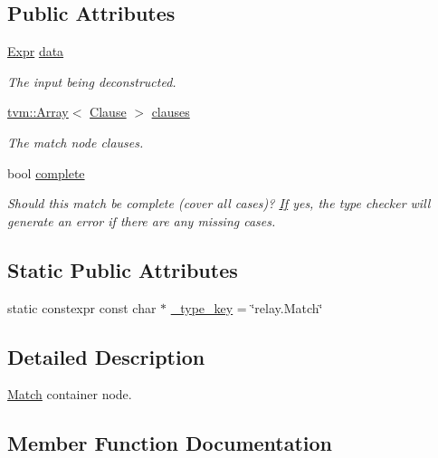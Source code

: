 \subsection*{Public Attributes}
\begin{DoxyCompactItemize}
\item 
\hyperlink{namespacetvm_1_1relay_a5b84e3790f89bb3fad5c7911eeb99531}{Expr} \hyperlink{classtvm_1_1relay_1_1MatchNode_a2bbd42a0a2bdbdf35662f8866c6a5f97}{data}
\begin{DoxyCompactList}\small\item\em The input being deconstructed. \end{DoxyCompactList}\item 
\hyperlink{classtvm_1_1Array}{tvm\+::\+Array}$<$ \hyperlink{classtvm_1_1relay_1_1Clause}{Clause} $>$ \hyperlink{classtvm_1_1relay_1_1MatchNode_a1e35f1c0a12e235eb052cd48f6659cd6}{clauses}
\begin{DoxyCompactList}\small\item\em The match node clauses. \end{DoxyCompactList}\item 
bool \hyperlink{classtvm_1_1relay_1_1MatchNode_a17c6c8bd3fccfa7f86ace014db7fd694}{complete}
\begin{DoxyCompactList}\small\item\em Should this match be complete (cover all cases)? \hyperlink{classtvm_1_1relay_1_1If}{If} yes, the type checker will generate an error if there are any missing cases. \end{DoxyCompactList}\end{DoxyCompactItemize}
\subsection*{Static Public Attributes}
\begin{DoxyCompactItemize}
\item 
static constexpr const char $\ast$ \hyperlink{classtvm_1_1relay_1_1MatchNode_ae09048eac4da99f3c259f431e376081d}{\+\_\+type\+\_\+key} = \char`\"{}relay.\+Match\char`\"{}
\end{DoxyCompactItemize}


\subsection{Detailed Description}
\hyperlink{classtvm_1_1relay_1_1Match}{Match} container node. 

\subsection{Member Function Documentation}
